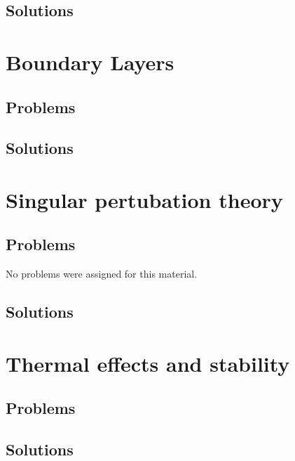       \section{Solutions}
         \shipoutAnswer

   \chapter{Boundary Layers}
      
      
      
      
      
      \section{Problems}
         
         
      \section{Solutions}
         \shipoutAnswer

   \chapter{Singular pertubation theory}
      
      
      
      \section{Problems}
         No problems were assigned for this material.
      \section{Solutions}
         \shipoutAnswer

   \chapter{Thermal effects and stability}
      
      
      
      \section{Problems}
         
      \section{Solutions}
         \shipoutAnswer

%   
